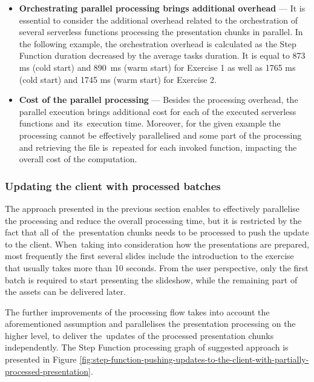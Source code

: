 \begin{itemize}
   \item \textbf{Orchestrating parallel processing brings additional overhead} --- It is essential to consider the additional overhead related to the orchestration of several serverless functions processing the presentation chunks in parallel. In the following example, the orchestration overhead is calculated as the Step Function duration decreased by the average tasks duration. It is equal to 873 ms (cold start) and 890~ms (warm start) for Exercise 1 as well as 1765 ms (cold start) and 1745 ms (warm start) for Exercise 2.
   \item \textbf{Cost of the parallel processing} --- Besides the processing overhead, the parallel execution brings additional cost for each of the executed serverless functions and~its~execution time. Moreover, for the given example the processing cannot be effectively parallelised and some part of the processing and retrieving the file is~repeated for each invoked function, impacting the overall cost of the computation.
\end{itemize}

\subsubsection{Updating the client with processed batches} \label{section:case-study-updating-the-client-with-processed-batch}

The approach presented in the previous section enables to effectively parallelise the processing and reduce the overall processing time, but it is restricted by the fact that all of~the~presentation chunks needs to be processed to push the update to the client. When~taking into consideration how the presentations are prepared, most frequently the first several slides include the introduction to the exercise that usually takes more than 10 seconds. From the user perspective, only the first batch is required to start presenting the slideshow, while the remaining part of the assets can be delivered later.

The further improvements of the processing flow takes into account the aforementioned assumption and parallelises the presentation processing on the higher level, to deliver the~updates of the processed presentation chunks independently. The Step Function processing graph of suggested approach is presented in Figure \ref{fig:step-function-pushing-updates-to-the-client-with-partially-processed-presentation}. 

